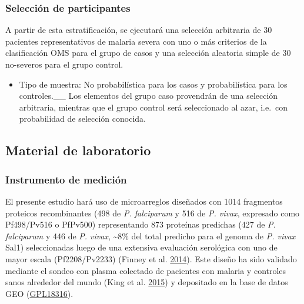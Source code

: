 \documentclass[
  a4paper]{article}
\providecommand{\tightlist}{%
  \setlength{\itemsep}{0pt}\setlength{\parskip}{0pt}}
\begin{document}
\hypertarget{selecciuxf3n-de-participantes}{%
\subsubsection{Selección de
participantes}\label{selecciuxf3n-de-participantes}}

A partir de esta estratificación, se ejecutará una selección arbitraria
de 30 pacientes representativos de malaria severa con uno o más
criterios de la clasificación OMS para el grupo de casos y una selección
aleatoria simple de 30 no-severos para el grupo control.

\begin{itemize}
\tightlist
\item
  Tipo de muestra: No probabilística para los casos y probabilística
  para los controles.\_\_ Los elementos del grupo caso provendrán de una
  selección arbitraria, mientras que el grupo control será seleccionado
  al azar, i.e.~con probabilidad de selección conocida.
\end{itemize}

\hypertarget{material-de-laboratorio}{%
\subsection{Material de laboratorio}\label{material-de-laboratorio}}

\hypertarget{instrumento-de-mediciuxf3n}{%
\subsubsection{Instrumento de
medición}\label{instrumento-de-mediciuxf3n}}

El presente estudio hará uso de microarreglos diseñados con 1014
fragmentos proteicos recombinantes (498 de \emph{P. falciparum} y 516 de
\emph{P. vivax}, expresado como Pf498/Pv516 o PfPv500) representando 873
proteínas predichas (427 de \emph{P. falciparum} y 446 de \emph{P.
vivax}, \textasciitilde{}8\% del total predicho para el genoma de
\emph{P. vivax} Sal1) seleccionadas luego de una extensiva evaluación
serológica con uno de mayor escala (Pf2208/Pv2233) (Finney et al.
\protect\hyperlink{ref-Finney2014}{2014}). Este diseño ha sido validado
mediante el sondeo con plasma colectado de pacientes con malaria y
controles sanos alrededor del mundo (King et al.
\protect\hyperlink{ref-King2015FOC}{2015}) y depositado en la base de
datos GEO
(\href{https://www.ncbi.nlm.nih.gov/geo/query/acc.cgi?acc=GPL18316}{GPL18316}).
\end{document}
